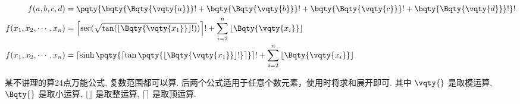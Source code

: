 \[
\begin{aligned}
	f(a, b, c, d)
	&= \pqty{ \bqty{\Bqty{\vqty{a}}}! + \bqty{\Bqty{\vqty{b}}}! + \bqty{\Bqty{\vqty{c}}}! + \bqty{\Bqty{\vqty{d}}}! }!
	\\
	f(x_1, x_2, \cdots, x_n)
	&= \left\lceil
		\sec(\sqrt{ \tan(
			\left\lfloor
				\Bqty{\vqty{x_1}}
			\right\rfloor !
		) }) \right\rceil ! +
	\sum_{i=2}^n {
		\left\lfloor
			\Bqty{\vqty{x_i}}
		\right\rfloor
	}
	\\
	f(x_1, x_2, \cdots, x_n)
	&= \left\lceil \sinh\pqty{
		\left\lceil \tan\pqty{
			\left\lfloor
				\Bqty{\vqty{x_1}}
			\right\rfloor !
		} \right\rceil
	} \right\rceil ! +
	\sum_{i=2}^n {
		\left\lfloor
			\Bqty{\vqty{x_i}}
		\right\rfloor
	}
\end{aligned}
\]

某不讲理的算24点万能公式, 复数范围都可以算. 后两个公式适用于任意个数元素，使用时将求和展开即可.
其中 $ \vqty{} $ 是取模运算, $ \Bqty{} $ 是取小运算, $ \lfloor\rfloor $ 是取整运算, $ \lceil\rceil $ 是取顶运算.
